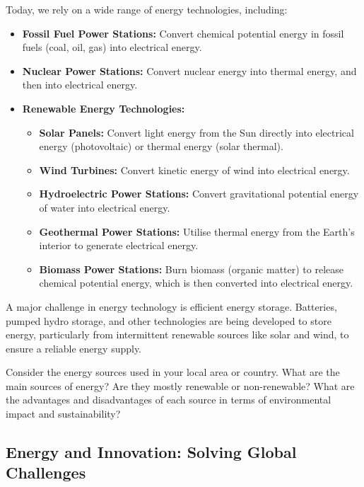 \begin{marginnote}
Today, we rely on a wide range of energy technologies, including:

\begin{itemize}
    \item \textbf{Fossil Fuel Power Stations:}  Convert chemical potential energy in fossil fuels (coal, oil, gas) into electrical energy.
    \item \textbf{Nuclear Power Stations:} Convert nuclear energy into thermal energy, and then into electrical energy.
    \item \textbf{Renewable Energy Technologies:}
        \begin{itemize}
            \item \textbf{Solar Panels:} Convert light energy from the Sun directly into electrical energy (photovoltaic) or thermal energy (solar thermal).
            \item \textbf{Wind Turbines:} Convert kinetic energy of wind into electrical energy.
            \item \textbf{Hydroelectric Power Stations:} Convert gravitational potential energy of water into electrical energy.
            \item \textbf{Geothermal Power Stations:}  Utilise thermal energy from the Earth's interior to generate electrical energy.
            \item \textbf{Biomass Power Stations:} Burn biomass (organic matter) to release chemical potential energy, which is then converted into electrical energy.
        \end{itemize}
\end{itemize}

\begin{marginnote}
A major challenge in energy technology is efficient energy storage.  Batteries, pumped hydro storage, and other technologies are being developed to store energy, particularly from intermittent renewable sources like solar and wind, to ensure a reliable energy supply.
\end{marginnote}

\begin{stopandthink}
Consider the energy sources used in your local area or country.  What are the main sources of energy? Are they mostly renewable or non-renewable? What are the advantages and disadvantages of each source in terms of environmental impact and sustainability?
\end{stopandthink}


\subsection{Energy and Innovation: Solving Global Challenges}


\end{marginnote}
